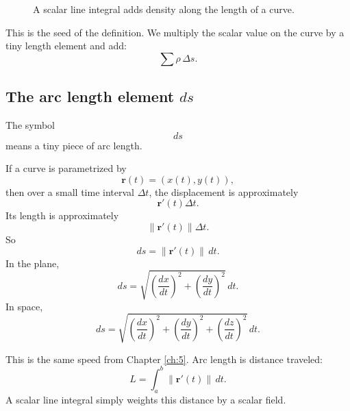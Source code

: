 \begin{figure}[h]
\centering
{}
\caption{A scalar line integral adds density along the length of a curve.}
\end{figure}

This is the seed of the definition.  We multiply the scalar value on the curve by a tiny
length element and add:
\[
    \sum \rho\,\Delta s.
\]

\subsection{The arc length element \texorpdfstring{\(ds\)}{ds}}

The symbol
\[
    ds
\]
means a tiny piece of arc length.

If a curve is parametrized by
\[
    \mathbf r(t)=(x(t),y(t)),
\]
then over a small time interval \(\Delta t\), the displacement is approximately
\[
    \mathbf r'(t)\Delta t.
\]
Its length is approximately
\[
    \|\mathbf r'(t)\|\Delta t.
\]
So
\[
\boxed{
    ds=\|\mathbf r'(t)\|\,dt.
}
\]
In the plane,
\[
\boxed{
    ds=
    \sqrt{\left(\frac{dx}{dt}\right)^2+
          \left(\frac{dy}{dt}\right)^2}\,dt.
}
\]
In space,
\[
\boxed{
    ds=
    \sqrt{\left(\frac{dx}{dt}\right)^2+
          \left(\frac{dy}{dt}\right)^2+
          \left(\frac{dz}{dt}\right)^2}\,dt.
}
\]

This is the same speed from Chapter \ref{ch:5}.  Arc length is distance traveled:
\[
    L=\int_a^b \|\mathbf r'(t)\|\,dt.
\]
A scalar line integral simply weights this distance by a scalar field.

